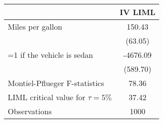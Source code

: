 \begin{tabular}{l*{1}{c}}
\hline\hline
                    &\multicolumn{1}{c}{IV LIML}\\
\hline
Miles per gallon    &      150.43\\
                    &     (63.05)\\
[1em]
=1 if the vehicle is sedan&    -4676.09\\
                    &    (589.70)\\
\hline
Montiel-Pflueger F-statistics&       78.36\\
LIML critical value for $\tau=5\%$&       37.42\\
Observations        &        1000\\
\hline\hline
\end{tabular}
